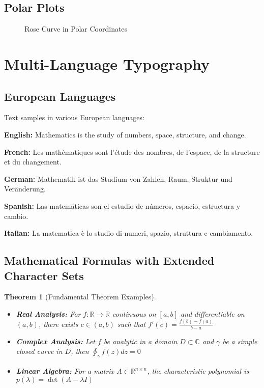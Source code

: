 \documentclass[12pt,a4paper,twoside]{article}
\newtheorem{theorem}{Theorem}[section]
\theoremstyle{definition}
\newcommand{\RealNumbers}{\mathbb{R}}
\newcommand{\ComplexNumbers}{\mathbb{C}}
\begin{document}
\subsection{Polar Plots}

\begin{figure}[H]
\centering
{}
\caption{Rose Curve in Polar Coordinates}
\label{fig:polar}
\end{figure}

\section{Multi-Language Typography}

\subsection{European Languages}

Text samples in various European languages:

\textbf{English:} Mathematics is the study of numbers, space, structure, and change.

\textbf{French:} Les mathématiques sont l'étude des nombres, de l'espace, de la structure et du changement.

\textbf{German:} Mathematik ist das Studium von Zahlen, Raum, Struktur und Veränderung.

\textbf{Spanish:} Las matemáticas son el estudio de números, espacio, estructura y cambio.

\textbf{Italian:} La matematica è lo studio di numeri, spazio, struttura e cambiamento.

\subsection{Mathematical Formulas with Extended Character Sets}

\begin{theorem}[Fundamental Theorem Examples]
\begin{itemize}
\item \textbf{Real Analysis:} For $f: \RealNumbers \to \RealNumbers$ continuous on $[a,b]$ and differentiable on $(a,b)$, there exists $c \in (a,b)$ such that $f'(c) = \frac{f(b)-f(a)}{b-a}$

\item \textbf{Complex Analysis:} Let $f$ be analytic in a domain $D \subset \ComplexNumbers$ and $\gamma$ be a simple closed curve in $D$, then $\oint_\gamma f(z) dz = 0$

\item \textbf{Linear Algebra:} For a matrix $A \in \RealNumbers^{n \times n}$, the characteristic polynomial is $p(\lambda) = \det(A - \lambda I)$
\end{itemize}
\end{theorem}
\end{document}
